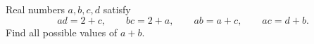 Real numbers $a,b,c,d$ satisfy
\[ad=2+c,\qquad bc=2+a,\qquad ab=a+c,\qquad ac=d+b.\]
Find all possible values of $a+b$.
